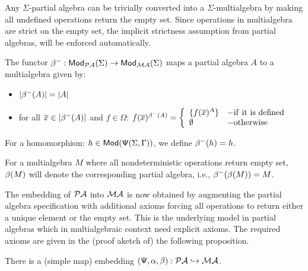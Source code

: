 \documentclass[10pt]{article}
\begin{document}
Any $\Sigma$-partial algebra can be trivially converted into a
$\Sigma$-multialgebra by making all undefined operations return the empty
set. 
Since operations in multialgebra are strict on the empty set, the
implicit strictness assumption from partial algebras, will be enforced
automatically.
\begin{definition}\label{de:MP}
The functor ${\sf {\beta}}^-:{\sf {Mod}}_{{\mathcal{PA}}}(\Sigma)\to{\sf {Mod}}_{{\mathcal{MA}}}(\Sigma)$
maps a partial algebra $A$ to a multialgebra given by:
\begin{itemize}\MyLPar
\item $|{\sf {\beta}}^-(A)|=|A|$
\item for all $\overline x\in |{\sf {\beta}}^-(A)|$ and $f\in\Omega$:
$f(\overline x)^{{\sf {\beta}}^{-}(A)}= \left\{\begin{array}{ll}\{f(\overline x)^A\} & - {\rm
if\ it\ is\ defined}\\
\emptyset & - {\rm otherwise} \end{array}\right.$
\end{itemize}
For a homomorphism:  $h \in {\sf {Mod}}({\sf {\Psi}}(\Sigma,\Gamma))$, we define ${\sf {\beta}}^-(h) = h$.

For a multialgebra $M$ where all nondeterministic operations return empty
set, ${\sf {\beta}}(M)$ will denote the
corresponding partial algebra, i.e., ${\sf {\beta}}^-({\sf {\beta}}(M))=M$.
\end{definition}
%
%
The embedding of ${\mathcal{PA}}$ into ${\mathcal{MA}}$ is now obtained by 
augmenting the
partial algebra specification with additional axioms forcing all operations
to return either a unique element or the empty set. This is the underlying
model in partial algebras which in multialgebraic context need explicit
axioms. The required axioms are given in the (proof aketch of) the following proposition.
%
\begin{proposition}\label{prop:PaMa}
There is a (simple map) embedding $({\sf {\Psi}},\alpha, \beta): {\mathcal{PA}}\hookrightarrow {\mathcal{MA}}$.
\end{proposition}
\end{document}
